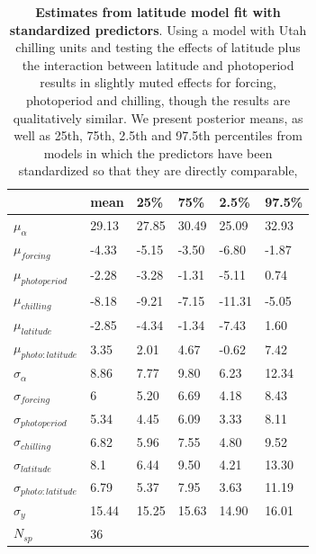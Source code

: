 \documentclass{article}
\begin{document}
\begin{footnotesize}
\begin{table}[ht]
\centering
\caption{\textbf{Estimates from latitude model fit with standardized predictors}. Using a model with Utah chilling units and testing the effects of latitude plus the interaction between latitude and photoperiod results in slightly muted effects for forcing, photoperiod and chilling, though the results are qualitatively similar. We present posterior means, as well as 25th, 75th, 2.5th and 97.5th percentiles from models in which the predictors have been standardized so that they are directly comparable,} 
\label{tab:lat}
\begingroup\footnotesize
\begin{tabular}{|p{}|p{}|p{}|p{}|p{}|p{}|}
  \hline
 & mean & 25\% & 75\% & 2.5\% & 97.5\% \\ 
  \hline
$\mu_{\alpha}$ & 29.13 & 27.85 & 30.49 & 25.09 & 32.93 \\ 
  $\mu_{forcing}$ & -4.33 & -5.15 & -3.50 & -6.80 & -1.87 \\ 
  $\mu_{photoperiod}$ & -2.28 & -3.28 & -1.31 & -5.11 & 0.74 \\ 
  $\mu_{chilling}$ & -8.18 & -9.21 & -7.15 & -11.31 & -5.05 \\ 
  $\mu_{latitude}$ & -2.85 & -4.34 & -1.34 & -7.43 & 1.60 \\ 
  $\mu_{photo:latitude}$ & 3.35 & 2.01 & 4.67 & -0.62 & 7.42 \\ 
  $\sigma_{\alpha}$ & 8.86 & 7.77 & 9.80 & 6.23 & 12.34 \\ 
  $\sigma_{forcing}$ & 6 & 5.20 & 6.69 & 4.18 & 8.43 \\ 
  $\sigma_{photoperiod}$ & 5.34 & 4.45 & 6.09 & 3.33 & 8.11 \\ 
  $\sigma_{chilling}$ & 6.82 & 5.96 & 7.55 & 4.80 & 9.52 \\ 
  $\sigma_{latitude}$ & 8.1 & 6.44 & 9.50 & 4.21 & 13.30 \\ 
  $\sigma_{photo:latitude}$ & 6.79 & 5.37 & 7.95 & 3.63 & 11.19 \\ 
  $\sigma_{y}$ & 15.44 & 15.25 & 15.63 & 14.90 & 16.01 \\ 
   \hline
$N_{sp}$ & 36 &  &  &  &  \\ 
   \hline
\end{tabular}
\endgroup
\end{table}


\end{footnotesize}
\end{document}
